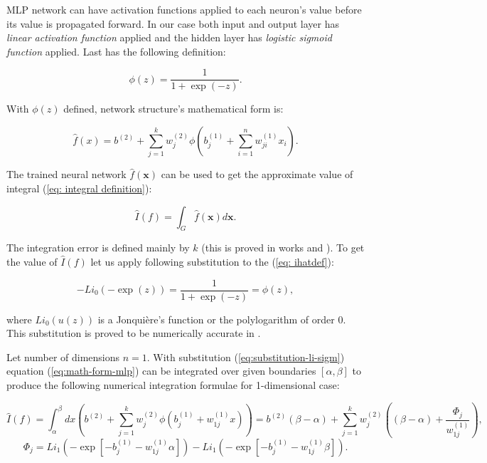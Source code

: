 \documentclass[%
]{ittmm}
\begin{document}
MLP network can have activation functions applied to each neuron's value before its value is propagated forward. In our case both input and output layer has \textit{linear activation function} applied and the hidden layer has \textit{logistic sigmoid function} applied. Last has the following definition:

\begin{equation}
    \label{eq:sigmoid}
    \phi(z) = \frac{1}{1+\exp(-z)}.
\end{equation}

\noindent With $\phi(z)$ defined, network structure's mathematical form is:

\begin{equation}
    \label{eq:math-form-mlp}
    \hat{f}(x) = b^{(2)} + \sum_{j=1}^{k}w_j^{(2)}\phi(b_j^{(1)}+\sum_{i=1}^{n}w_{ji}^{(1)}x_{i}).
\end{equation}

\noindent The trained neural network $\hat{f}(\mathbf{x})$ can be used to get the approximate value of integral (\ref{eq: integral definition}):

\begin{equation}
    \label{eq: ihatdef}
    \hat{I}(f) = \int_G \hat{f}(\mathbf{x})d\mathbf{x}.
\end{equation}

\noindent The integration error is defined mainly by $k$ (this is proved in works \cite{lloyd2020using} and \cite{cybenko1989approximation}). To get the value of $\hat{I}(f)$ let us apply following substitution to the (\ref{eq: ihatdef}):

\begin{equation}
    \label{eq:substitution-li-sigm}
    -Li_0(-\exp(z)) = \frac{1}{1+\exp(-z)} = \phi(z),
\end{equation}

\noindent where $Li_0(u(z))$ is a Jonquière's function or the polylogarithm of order 0. This substitution is proved to be numerically accurate in \cite{lloyd2020using}.

Let number of dimensions $n = 1$. With substitution (\ref{eq:substitution-li-sigm}) equation (\ref{eq:math-form-mlp}) can be integrated over given boundaries $[\alpha, \beta]$ to produce the following numerical integration formulae for 1-dimensional case:

\begin{equation}
	\label{eq:numerical_method_1}
	\hat{I}(f) = \int_{\alpha}^{\beta} dx \left(b^{(2)} + \sum_{j=1}^{k}w_j^{(2)}\phi(b_j^{(1)} + w_{1j}^{(1)}x) \right) = b^{(2)}(\beta - \alpha) + \sum_{j=1}^{k}w_j^{(2)} \left( (\beta - \alpha) + \frac{\Phi_j}{w_{1j}^{(1)}} \right),
\end{equation}
\begin{equation}
	\label{eq:numerical_method_last}
	\Phi_j = Li_1(-\exp[-b_j^{(1)}-w_{1j}^{(1)}\alpha]) - Li_1(-\exp[-b_j^{(1)}-w_{1j}^{(1)}\beta]).
\end{equation}
\end{document}
